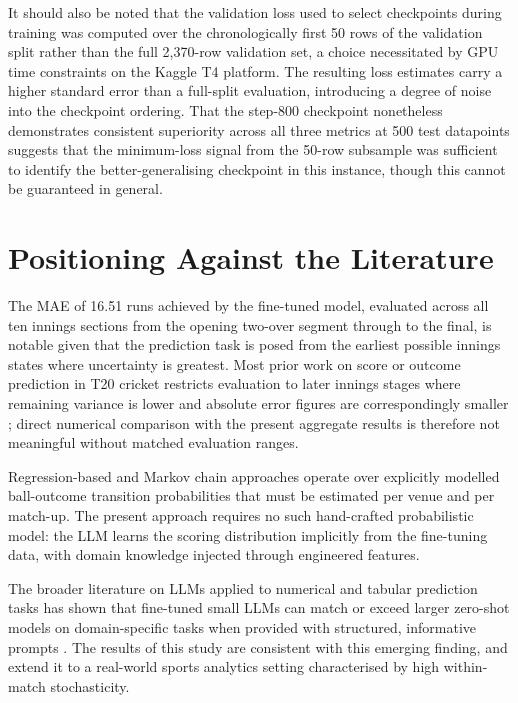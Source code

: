 It should also be noted that the validation loss used to select checkpoints during training was computed over the chronologically first 50 rows of the validation split rather than the full 2,370-row validation set, a choice necessitated by GPU time constraints on the Kaggle T4 platform. The resulting loss estimates carry a higher standard error than a full-split evaluation, introducing a degree of noise into the checkpoint ordering. That the step-800 checkpoint nonetheless demonstrates consistent superiority across all three metrics at 500 test datapoints suggests that the minimum-loss signal from the 50-row subsample was sufficient to identify the better-generalising checkpoint in this instance, though this cannot be guaranteed in general.

\section{Positioning Against the Literature}

The MAE of 16.51 runs achieved by the fine-tuned model, evaluated across all ten innings sections from the opening two-over segment through to the final, is notable given that the prediction task is posed from the earliest possible innings states where uncertainty is greatest. Most prior work on score or outcome prediction in T20 cricket restricts evaluation to later innings stages where remaining variance is lower and absolute error figures are correspondingly smaller \cite{iyer2009prediction,kampakis2015using}; direct numerical comparison with the present aggregate results is therefore not meaningful without matched evaluation ranges.

Regression-based and Markov chain approaches \cite{bailey2004predicting,perera2012markov} operate over explicitly modelled ball-outcome transition probabilities that must be estimated per venue and per match-up. The present approach requires no such hand-crafted probabilistic model: the LLM learns the scoring distribution implicitly from the fine-tuning data, with domain knowledge injected through engineered features.

The broader literature on LLMs applied to numerical and tabular prediction tasks has shown that fine-tuned small LLMs can match or exceed larger zero-shot models on domain-specific tasks when provided with structured, informative prompts \cite{hegselmann2023tabllm,gruver2023large}. The results of this study are consistent with this emerging finding, and extend it to a real-world sports analytics setting characterised by high within-match stochasticity.

